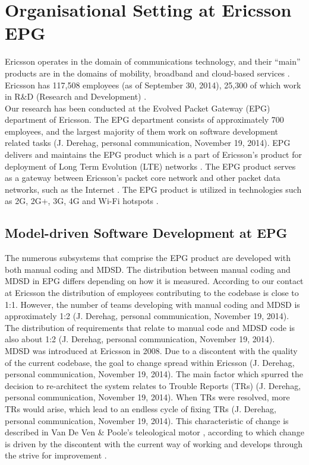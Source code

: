 \documentclass[final_report_innit.tex]{subfiles}
\begin{document}
\section{Organisational Setting at Ericsson EPG}
Ericsson operates in the domain of communications technology, and their ``main'' products are in the domains of mobility, broadband and cloud-based services \cite{etc} \cite{ecf}. Ericsson has 117,508 employees (as of September 30, 2014), 25,300 of which work in R\&D (Research and Development) \cite{etc}.
\\

Our research has been conducted at the Evolved Packet Gateway (EPG) department of Ericsson. The EPG department consists of approximately 700 employees, and the largest majority of them work on software development related tasks (J. Derehag, personal communication, November 19, 2014). EPG delivers and maintains the EPG product which is a part of Ericsson’s product for deployment of Long Term Evolution (LTE) networks \cite{eepg}. The EPG product serves as a gateway between Ericsson’s packet core network and other packet data networks, such as the Internet \cite{eepg}. The EPG product is utilized in technologies such as 2G, 2G+, 3G, 4G and Wi-Fi hotspots \cite{eepg}.

\subsection*{Model-driven Software Development at EPG}
The numerous subsystems that comprise the EPG product are developed with both manual coding and MDSD. The distribution between manual coding and MDSD in EPG differs depending on how it is measured. According to our contact at Ericsson the distribution of employees contributing to the codebase is close to 1:1. However, the number of teams developing with manual coding and MDSD is approximately 1:2 (J. Derehag, personal communication, November 19, 2014). The distribution of requirements that relate to manual code and MDSD code is also about 1:2 (J. Derehag, personal communication, November 19, 2014).
\\

MDSD was introduced at Ericsson in 2008. Due to a discontent with the quality of the current codebase, the goal to change spread within Ericsson (J. Derehag, personal communication, November 19, 2014). The main factor which spurred the decision to re-architect the system relates to Trouble Reports (TRs) (J. Derehag, personal communication, November 19, 2014). When TRs were resolved, more TRs would arise, which lead to an endless cycle of fixing TRs (J. Derehag, personal communication, November 19, 2014). This characteristic of change is described in Van De Ven \& Poole’s teleological motor \cite{van1995explaining}, according to which change is driven by the discontent with the current way of working and develops through the strive for improvement \cite{van1995explaining}. 
\\
\end{document}
